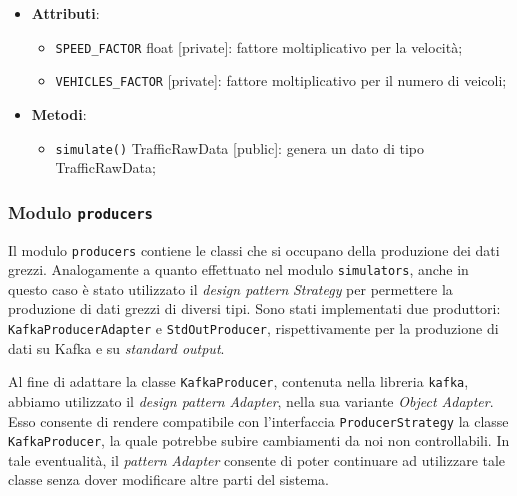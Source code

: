 \begin{itemize}
\begin{itemize}
		      \item \textbf{Attributi}:
		            \begin{itemize}
			            \item \texttt{SPEED\_FACTOR} float [private]: fattore moltiplicativo per la velocità;
			            \item \texttt{VEHICLES\_FACTOR} [private]: fattore moltiplicativo per il numero di veicoli;
		            \end{itemize}
		      \item \textbf{Metodi}:
		            \begin{itemize}
			            \item \texttt{simulate()} TrafficRawData [public]: genera un dato di tipo TrafficRawData;
		            \end{itemize}
	      \end{itemize}

\end{itemize}

\subsubsection{Modulo \texttt{producers}}
Il modulo \texttt{producers} contiene le classi che si occupano della produzione dei dati grezzi.
Analogamente a quanto effettuato nel modulo \texttt{simulators}, anche in questo caso è stato utilizzato il \textit{design pattern} \textit{Strategy} per permettere la produzione di dati grezzi di diversi tipi.
Sono stati implementati due produttori: \texttt{KafkaProducerAdapter} e \texttt{StdOutProducer}, rispettivamente per la produzione di dati su Kafka e su \textit{standard output}.

Al fine di adattare la classe \texttt{KafkaProducer}, contenuta nella libreria \texttt{kafka}, abbiamo utilizzato il \textit{design pattern} \textit{Adapter}, nella sua variante
\textit{Object Adapter}. Esso consente di rendere compatibile con l'interfaccia \texttt{ProducerStrategy} la classe \texttt{KafkaProducer}, la quale potrebbe subire
cambiamenti da noi non controllabili. In tale eventualità, il \textit{pattern} \textit{Adapter} consente di poter continuare ad utilizzare tale classe senza dover modificare altre parti del sistema.

